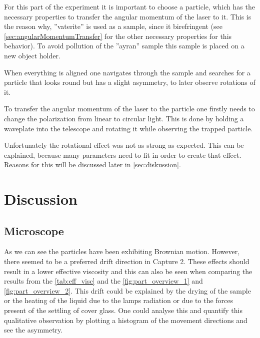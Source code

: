 \documentclass[12pt,english]{scrartcl}
\begin{document}
For this part of the experiment it is important to choose a particle, which has
the necessary properties to transfer the angular momentum of the laser to it.
This is the reason why, ''vaterite'' is used as a sample, since it birefringent
(see \autoref{sec:angularMomentumTransfer} for the other necessary properties
for this behavior). To avoid pollution of the ''ayran'' sample this sample is
placed on a new object holder.

When everything is aligned one navigates through the sample and searches for a
particle that looks round but has a slight asymmetry, to later observe
rotations of it.

To transfer the angular momentum of the laser to the particle one firstly needs
to change the polarization from linear to circular light. This is done by
holding a waveplate into the telescope and rotating it while observing the
trapped particle.


Unfortunately the rotational effect was not as strong as expected. This can be
explained, because many parameters need to fit in order to create that effect.
Reasons for this will be discussed later in \autoref{sec:diskussion}.

\section{Discussion}\label{sec:diskussion}


\subsection{Microscope}

As we can see the particles have been exhibiting Brownian motion. However,
there seemed to be a preferred drift direction in Capture 2. These effects
should result in a lower effective viscosity and this can also be seen when
comparing the results from the \autoref{tab:eff_visc} and the
\autoref{fig:part_overview_1} and \autoref{fig:part_overview_2}. This drift
could be explained by the drying of the sample or the heating of the liquid due
to the lamps radiation or due to the forces present of the settling of cover
glass. One could analyse this and quantify this qualitative observation by
plotting a histogram of the movement directions and see the asymmetry.
\end{document}
